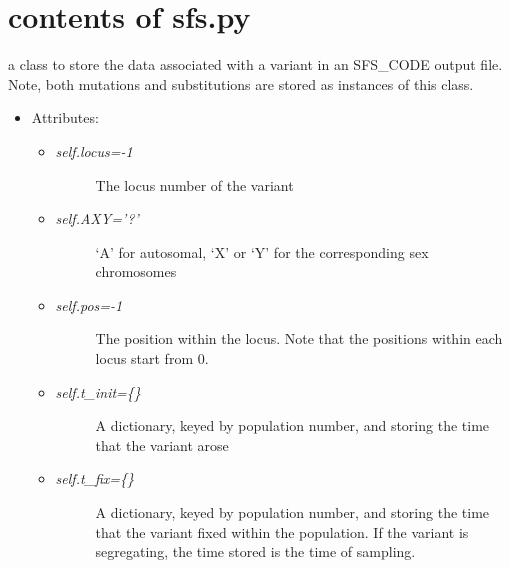 \documentclass[letterpaper,10pt,english]{sphinxmanual}
\begin{document}
\section{contents of sfs.py}
\label{index:contents-of-sfs-py}\label{index:module-sfs}

\begin{fulllineitems}
\label{index:sfs.Mutation}
a class to store the data associated with a variant in an 
SFS\_CODE output file.  Note, both mutations and substitutions
are stored as instances of this class.
\begin{itemize}
\item {} 
Attributes:
\begin{itemize}
\item {} \begin{description}
\item[{\emph{self.locus=-1}}] \leavevmode
The locus number of the variant

\end{description}

\item {} \begin{description}
\item[{\emph{self.AXY='?'} }] \leavevmode
`A' for autosomal, `X' or `Y' for the corresponding sex
chromosomes

\end{description}

\item {} \begin{description}
\item[{\emph{self.pos=-1}}] \leavevmode
The position within the locus.  Note that the positions
within each locus start from 0.

\end{description}

\item {} \begin{description}
\item[{\emph{self.t\_init=\{\}} }] \leavevmode
A dictionary, keyed by population number, and storing 
the time that the variant arose

\end{description}

\item {} \begin{description}
\item[{\emph{self.t\_fix=\{\}}}] \leavevmode
A dictionary, keyed by population number, and storing 
the time that the variant fixed within the population.
If the variant is segregating, the time stored is the
time of sampling.


\end{description}
\end{itemize}
\end{itemize}
\end{fulllineitems}
\end{document}
